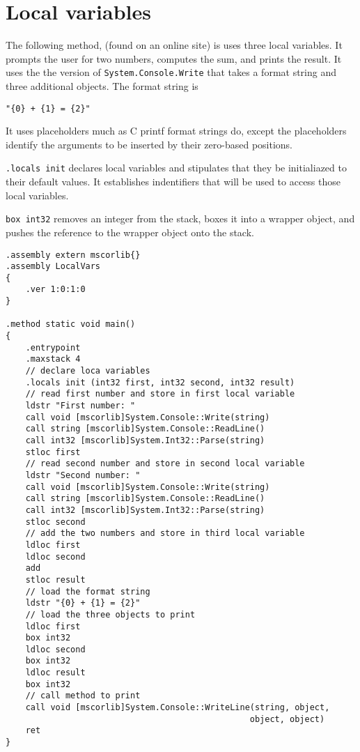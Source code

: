 \documentclass[10pt,a4paper]{amsart}
\begin{document}
\section{Local variables}

The following method, (found on an online site) is uses three local variables.
It prompts the user for two numbers, computes the sum, and prints the result. It uses the
the version of {\tt System.Console.Write} that takes a format string and three additional objects.
The format string is
\begin{verbatim}
"{0} + {1} = {2}"
\end{verbatim}
It uses placeholders much as C printf format strings do, except the placeholders identify the
arguments to be inserted by their zero-based positions.

{\tt .locals init} declares local variables and stipulates that they be initialiazed to their default
values. It establishes indentifiers that will be used to access those local variables.

{\tt box int32} removes an integer from the stack, boxes it into a wrapper object, and pushes
the reference to the wrapper object onto the stack.

\begin{verbatim}
.assembly extern mscorlib{}
.assembly LocalVars
{
    .ver 1:0:1:0
}

.method static void main()
{
    .entrypoint
    .maxstack 4
    // declare loca variables 
    .locals init (int32 first, int32 second, int32 result)
    // read first number and store in first local variable
    ldstr "First number: "
    call void [mscorlib]System.Console::Write(string)
    call string [mscorlib]System.Console::ReadLine()
    call int32 [mscorlib]System.Int32::Parse(string)
    stloc first
    // read second number and store in second local variable
    ldstr "Second number: "
    call void [mscorlib]System.Console::Write(string)
    call string [mscorlib]System.Console::ReadLine()
    call int32 [mscorlib]System.Int32::Parse(string)
    stloc second
    // add the two numbers and store in third local variable
    ldloc first
    ldloc second
    add
    stloc result
    // load the format string
    ldstr "{0} + {1} = {2}"
    // load the three objects to print
    ldloc first
    box int32    
    ldloc second
    box int32    
    ldloc result
    box int32
    // call method to print
    call void [mscorlib]System.Console::WriteLine(string, object, 
                                                 object, object) 
    ret
}
\end{verbatim}
\end{document}
